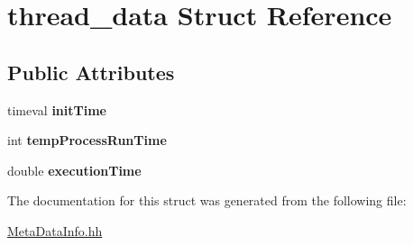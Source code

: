 \hypertarget{structthread__data}{}\section{thread\+\_\+data Struct Reference}
\label{structthread__data}
\subsection*{Public Attributes}
\begin{DoxyCompactItemize}
\item 
timeval {\bfseries init\+Time}\hypertarget{structthread__data_a70f378a618101aab4d9fe8e41d820674}{}\label{structthread__data_a70f378a618101aab4d9fe8e41d820674}

\item 
int {\bfseries temp\+Process\+Run\+Time}\hypertarget{structthread__data_a191cbc39e2ec8ab190cc8566f9a1662c}{}\label{structthread__data_a191cbc39e2ec8ab190cc8566f9a1662c}

\item 
double {\bfseries execution\+Time}\hypertarget{structthread__data_a6242a266249dff45708a3c45a7a54b9b}{}\label{structthread__data_a6242a266249dff45708a3c45a7a54b9b}

\end{DoxyCompactItemize}


The documentation for this struct was generated from the following file\+:\begin{DoxyCompactItemize}
\item 
\hyperlink{_meta_data_info_8hh}{Meta\+Data\+Info.\+hh}\end{DoxyCompactItemize}
